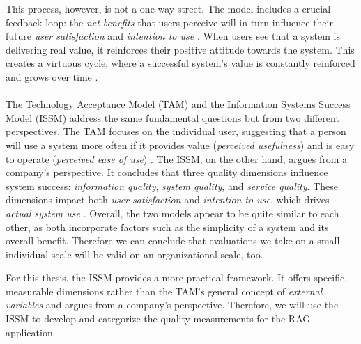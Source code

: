 \documentclass[
	english,
	ruledheaders=section,%
	class=report,%
	thesis={type=bachelor},%
	accentcolor=1b,%
	custommargins=true,%
	marginpar=false,%
	parskip=half-,%
	fontsize=11pt,%
	DIV=14,
]{tudapub}
\begin{document}
This process, however, is not a one-way street. The model includes a crucial feedback loop: the \textit{net benefits} that users perceive will in turn influence their future \textit{user satisfaction} and \textit{intention to use} \parencite[p.~23-24]{DeloneMcLean2003ISSuccessTenYearUpdate}. When users see that a system is delivering real value, it reinforces their positive attitude towards the system. This creates a virtuous cycle, where a successful system's value is constantly reinforced and grows over time \parencite[p.~23]{DeloneMcLean2003ISSuccessTenYearUpdate}.\\
\\
The Technology Acceptance Model (TAM) and the Information Systems Success Model (ISSM) address the same fundamental questions but from two different perspectives. The TAM focuses on the individual user, suggesting that a person will use a system more often if it provides value (\textit{perceived usefulness}) and is easy to operate (\textit{perceived ease of use}) \parencite[p.~320]{Davis1989}.
The ISSM, on the other hand, argues from a company's perspective. It concludes that three quality dimensions influence system success: \textit{information quality}, \textit{system quality}, and \textit{service quality}. These dimensions impact both \textit{user satisfaction} and \textit{ intention to use}, which drives \textit{actual system use} \parencite[pp.~22-23]{DeloneMcLean2003ISSuccessTenYearUpdate}. Overall, the two models appear to be quite similar to each other, as both incorporate factors such as the simplicity of a system and its overall benefit. Therefore we can conclude that evaluations we take on a small individual scale will be valid on an organizational scale, too.

For this thesis, the ISSM provides a more practical framework. It offers specific, measurable dimensions rather than the TAM's general concept of \textit{external variables} and argues from a company's perspective. Therefore, we will use the ISSM to develop and categorize the quality measurements for the RAG application.

\newpage
\end{document}
